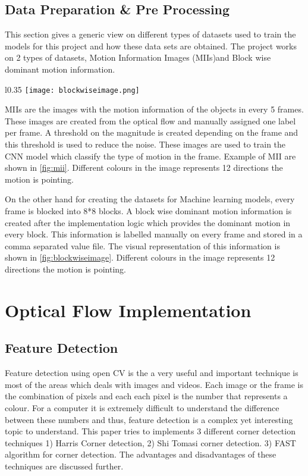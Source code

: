 \section{Data Preparation \& Pre Processing}
This section gives a generic view on different types of datasets used to train the models for this project and how these data sets are obtained. The project works on 2 types of datasets, Motion Information Images (MIIs)and Block wise dominant motion information. 
\begin{wrapfigure}{l}{0.35\textwidth}
    \centering
    \texttt{[image: blockwiseimage.png]}
	\caption{Block wise dominant motion Information}
	\label{fig:blockwiseimage}
\end{wrapfigure}
MIIs are the images with the motion information of the objects in every 5 frames. These images are created from the optical flow and manually assigned one label per frame. A threshold on the magnitude is created depending on the frame and this threshold is used to reduce the noise. These images are used to train the CNN model which classify the type of motion in the frame. Example of MII are shown in \ref{fig:mii}. Different colours in the image represents 12 directions the motion is pointing.

On the other hand for creating the datasets for Machine learning models, every frame is blocked into 8*8 blocks. A block wise dominant motion information is created after the implementation logic which provides the dominant motion in every block. This information is labelled manually on every frame and stored in a comma separated value file. The visual representation of this information is shown in \ref{fig:blockwiseimage}. Different colours in the image represents 12 directions the motion is pointing.

\chapter{Optical Flow Implementation}
\section{Feature Detection}
Feature detection using open CV is the a very useful and important technique is most of the areas which deals with images and videos. Each image or the frame is the combination of pixels and each each pixel is the number that represents a colour. For a computer it is extremely difficult to understand the difference between these numbers and thus, feature detection is a complex yet interesting topic to understand. This paper tries to implements 3 different corner detection techniques 1) Harris Corner detection, 2) Shi Tomasi corner detection. 3) FAST algorithm for corner detection. The advantages and disadvantages of these techniques are discussed further.
